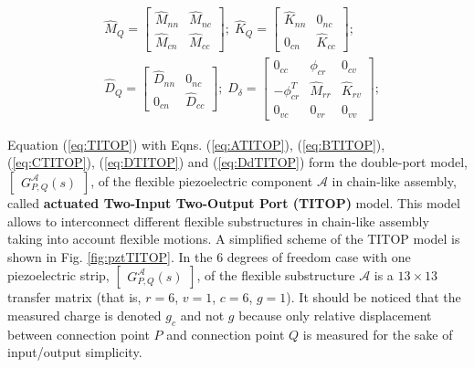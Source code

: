 \documentclass{ifacconf}
\begin{document}
\begin{equation} \label{eq:DdTITOP}
\begin{split}
& \hat{M}_Q =
\begin{bmatrix}
\hat{M}_{nn} & \hat{M}_{nc} \\
\hat{M}_{cn} & \hat{M}_{cc}
\end{bmatrix} ; \; \hat{K}_Q =
\begin{bmatrix}
\hat{K}_{nn} & 0_{nc} \\
0_{cn} & \hat{K}_{cc}
\end{bmatrix}; \; \\ 
&\hat{D}_Q =
\begin{bmatrix}
\hat{D}_{nn} & 0_{nc} \\
0_{cn} & \hat{D}_{cc}
\end{bmatrix}; \; D_{\delta} = \begin{bmatrix} 0_{cc} & \phi_{cr} & 0_{cv}\\ 
-\phi_{cr}^T & \hat{M}_{rr} & \hat{K}_{rv} \\ 0_{vc} & 0_{vr} & 0_{vv}
\end{bmatrix} ;
\end{split}
\end{equation}

Equation (\ref{eq:TITOP}) with Eqns. (\ref{eq:ATITOP}), (\ref{eq:BTITOP}), (\ref{eq:CTITOP}), (\ref{eq:DTITOP}) and (\ref{eq:DdTITOP}) form the double-port model, $ \begin{bmatrix} G^\mathcal{A}_{P,Q} (s) \end{bmatrix} $, of the flexible piezoelectric component $\mathcal{A}$ in chain-like assembly, called \textbf{actuated Two-Input Two-Output Port (TITOP)} model. This model allows to interconnect different flexible substructures in chain-like assembly taking into account flexible motions. A simplified scheme of the TITOP model is shown in Fig. \ref{fig:pztTITOP}. In the 6 degrees of freedom case with one piezoelectric strip, $ \begin{bmatrix} G^\mathcal{A}_{P,Q} (s) \end{bmatrix} $, of the flexible substructure $\mathcal{A}$ is a $13 \times 13$ transfer matrix (that is, $r=6$, $v=1$, $c=6$, $g=1$). It should be noticed that the measured charge is denoted $g_c$ and not $g$ because only relative displacement between connection point $P$ and connection point $Q$ is measured for the sake of input/output simplicity.
\end{document}
